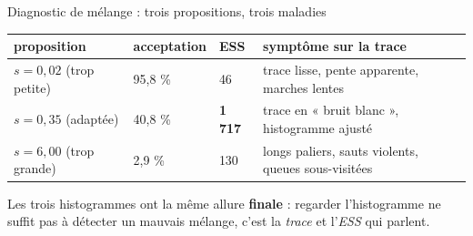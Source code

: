 \begin{frame}{Diagnostic de mélange : trois propositions, trois maladies}
\footnotesize

\vspace{-2.5mm}
\begin{solbox}
\centering\small
\begin{tabular}{@{}llll@{}}
\toprule
proposition & acceptation & ESS & symptôme sur la trace \\
\midrule
$s = 0{,}02$ (trop petite) & 95,8 \% & 46 & trace lisse, pente apparente, marches lentes \\
$s = 0{,}35$ (adaptée) & 40,8 \% & \textbf{1 717} & trace en « bruit blanc », histogramme ajusté \\
$s = 6{,}00$ (trop grande) & 2,9 \% & 130 & longs paliers, sauts violents, queues sous-visitées \\
\bottomrule
\end{tabular}
\vspace{1mm}
\raggedright
Les trois histogrammes ont la même allure \textbf{finale} : regarder l'histogramme
ne suffit pas à détecter un mauvais mélange, c'est la \emph{trace} et l'\emph{ESS}
qui parlent.
\end{solbox}
\end{frame}
